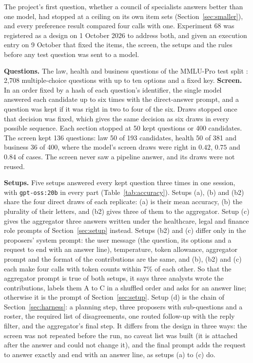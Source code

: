 \documentclass[10pt,twocolumn]{article}
\begin{document}
The project's first question, whether a council of specialists answers
better than one model, had stopped at a ceiling on its own item sets
(Section~\ref{sec:smaller}), and every preference result compared four
calls with one. Experiment 68 was registered as a design on 1 October
2026 to address both, and given an execution entry on 9 October that
fixed the items, the screen, the setups and the rules before any test
question was sent to a model.

\textbf{Questions.} The law, health and business questions of the
MMLU-Pro test split \cite{wang2024mmlupro}: 2{,}708 multiple-choice
questions with up to ten options and a fixed key. \textbf{Screen.} In an
order fixed by a hash of each question's identifier, the single model
answered each candidate up to six times with the direct-answer prompt,
and a question was kept if it was right in two to four of the six. Draws
stopped once that decision was fixed, which gives the same decision as
six draws in every possible sequence. Each section stopped at 50 kept
questions or 400 candidates. The screen kept 136 questions: law 50 of
193 candidates, health 50 of 381 and business 36 of 400, where the
model's screen draws were right in $0.42$, $0.75$ and $0.84$ of cases.
The screen never saw a pipeline answer, and its draws were not reused.

\textbf{Setups.} Five setups answered every kept question three times
in one session, with \texttt{gpt-oss:20b} in every part
(Table~\ref{tab:accuracy}). Setups (a), (b) and (b2) share the four
direct draws of each replicate: (a) is their mean accuracy, (b) the
plurality of their letters, and (b2) gives three of them to the
aggregator. Setup (c) gives the aggregator three answers written under
the healthcare, legal and finance role prompts of
Section~\ref{sec:setup} instead. Setups (b2) and (c) differ only in the
proposers' system prompt: the user message (the question, its options
and a request to end with an answer line), temperature, token allowance,
aggregator prompt and the format of the contributions are the same, and
(b), (b2) and (c) each make four calls with token counts within 7\% of
each other. So that the aggregator prompt is true of both setups, it
says three analysts wrote the contributions, labels them A to C in a
shuffled order and asks for an answer line; otherwise it is the prompt
of Section~\ref{sec:setup}. Setup (d) is the chain of Section~\ref{sec:harness}: a
planning step, three proposers with sub-questions and a roster, the
required list of disagreements, one routed follow-up with the reply
filter, and the aggregator's final step. It differs from the design in
three ways: the screen was not repeated before the run, no caveat list
was built (it is attached after the answer and could not change it),
and the final prompt adds the request to answer exactly and end with an
answer line, as setups (a) to (c) do.
\end{document}
